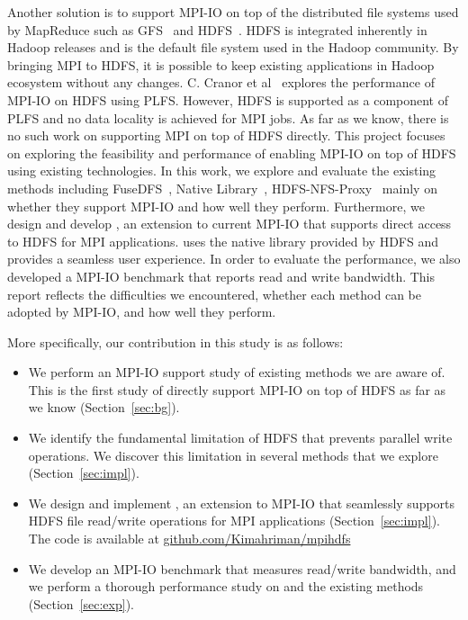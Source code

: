 Another solution is to support MPI-IO on top of the distributed file systems
used by MapReduce such as GFS~\cite{gfs} and HDFS~\cite{hdfs}. HDFS is integrated
inherently in Hadoop releases and is the default file system used in the Hadoop
community. By bringing MPI to HDFS, it is possible to keep existing applications
in Hadoop ecosystem without any changes. C. Cranor et al~\cite{CMU-PDL-12-115} explores the
performance of MPI-IO on HDFS using PLFS. However, HDFS is supported as a
component of PLFS and no data locality is achieved for MPI jobs. As far as we
know, there is no such work on supporting MPI on top of HDFS directly. This
project focuses on exploring the feasibility and performance of enabling MPI-IO
on top of HDFS using existing technologies. In this work, we explore and evaluate
the existing methods including FuseDFS~\cite{fuse}, Native Library~\cite{lib},
HDFS-NFS-Proxy~\cite{proxy} mainly on whether they support MPI-IO and how
well they perform. Furthermore, we design and develop
{\proj}, an extension to current MPI-IO that supports direct access to HDFS for
MPI applications. {\proj} uses the native library provided by HDFS and provides a
seamless user experience. In order to evaluate the performance, we also
developed a MPI-IO benchmark that reports read and write bandwidth. This report
reflects the difficulties we encountered, whether each method can be adopted by
MPI-IO, and how well they perform. 

More specifically, our contribution in this study is as follows:
\begin{itemize}
\item We perform an MPI-IO support study of existing methods we are aware of. This
	is the first study of directly support MPI-IO on top of HDFS as far as
	we know (Section~\ref{sec:bg}).
\item We identify the fundamental limitation of HDFS that prevents parallel
	write operations. We discover this limitation in several methods that we
	explore (Section~\ref{sec:impl}).
\item We design and implement {\proj}, an extension to MPI-IO that seamlessly
	supports HDFS file read/write operations for MPI applications 
	(Section~\ref{sec:impl}). The code is available at \url{github.com/Kimahriman/mpihdfs}
\item We develop an MPI-IO benchmark that measures read/write bandwidth, and
	we perform a thorough performance study on {\proj} and the existing
	methods (Section~\ref{sec:exp}).
\end{itemize}

